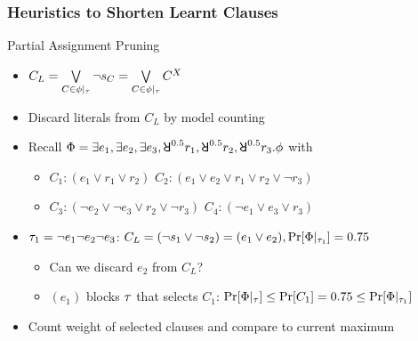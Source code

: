 \begin{frame}
    \frametitle{Heuristics to Shorten Learnt Clauses}
    \begin{block}{Partial Assignment Pruning}
        \begin{itemize}
            \item $C_L=\bigvee\limits_{C\in\phi|_{\tau}}\lnot s_{C}=\bigvee\limits_{C\in\phi|_{\tau}}C^X$
                  \pause
            \item Discard literals from $C_L$ by model counting
                  \pause
            \item Recall $\Qf=\exists e_1,\exists e_2,\exists e_3,\random{0.5} r_1,\random{0.5} r_2,\random{0.5} r_3.\pf$ with
                  \begin{itemize}
                      \item[] $C_1: (e_1 \lor r_1 \lor r_2)$ $C_2: (e_1 \lor e_2 \lor r_1 \lor r_2 \lor \lnot r_3)$
                      \item[] $C_3: (\lnot e_2 \lor \lnot e_3 \lor r_2 \lor \lnot r_3)$ $C_4: (\lnot e_1 \lor e_3 \lor r_3)$
                  \end{itemize}
                  \pause
            \item $\tau_1=\lnot e_1 \lnot e_2 \lnot e_3$: $C_L=(\lnot s_1\lor\lnot s_2)=(e_1\lor e_2),\Pr[\Phi|_{\tau_1}]=0.75$
                  \pause
                  \begin{itemize}
                      \item Can we discard $e_2$ from $C_L$?
                            \pause
                      \item $(e_1)$ blocks $\tau$ that selects $C_1$: $\Pr[\Phi|_{\tau}]\leq\Pr[C_1]=0.75\leq\Pr[\Phi|_{\tau_1}]$
                            \pause
                  \end{itemize}
            \item Count weight of selected clauses and compare to current maximum
        \end{itemize}
    \end{block}
\end{frame}


